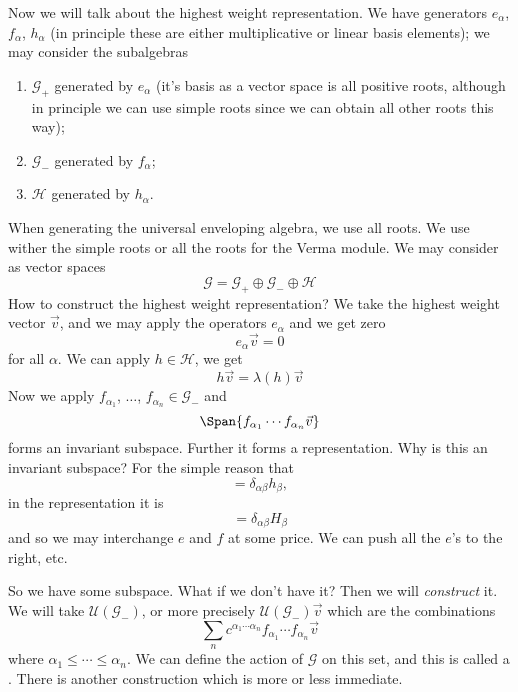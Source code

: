 Now we will talk about the highest weight representation. We have
generators $e_{\alpha}$, $f_{\alpha}$, $h_{\alpha}$ (in principle
these are either multiplicative or linear basis elements); we may
consider the subalgebras
\begin{enumerate}
\item $\mathscr{G}_{+}$ generated by $e_{\alpha}$ (it's basis as
  a vector space is all positive roots, although in principle we
  can use simple roots since we can obtain all other roots this way);
\item $\mathscr{G}_{-}$ generated by $f_{\alpha}$;
\item $\mathscr{H}$ generated by $h_{\alpha}$.
\end{enumerate}
When generating the universal enveloping algebra, we use all
roots. We use wither the simple roots or all the roots for the
Verma module. We may consider as vector spaces
\begin{equation}
\mathscr{G}=\mathscr{G}_{+}\oplus\mathscr{G}_{-}\oplus\mathscr{H}
\end{equation}
How to construct the highest weight representation? We take the
highest weight vector $\vec{v}$, and we may apply the operators
$e_{\alpha}$ and we get zero
\begin{equation}
e_{\alpha}\vec{v}=0
\end{equation}
for all $\alpha$. We can apply $h\in\mathscr{H}$, we get
\begin{equation}
h\vec{v}=\lambda(h)\vec{v}
\end{equation}
Now we apply $f_{\alpha_{1}}$, $\dots$,
$f_{\alpha_{n}}\in\mathscr{G}_{-}$ and
\begin{equation}
\Span\{f_{\alpha_{1}}\cdots f_{\alpha_{n}}\vec{v}\}
\end{equation}
forms an invariant subspace. Further it forms a
representation. Why is this an invariant subspace? For the simple
reason that
\begin{equation}
[e_{\alpha},f_{\beta}]=\delta_{\alpha\beta}h_{\beta},
\end{equation}
in the representation it is
\begin{equation}
[E_{\alpha},F_{\beta}]=\delta_{\alpha\beta}H_{\beta}
\end{equation}
and so we may interchange $e$ and $f$ at some price. We can push
all the $e$'s to the right, etc.

So we have some subspace. What if we don't have it? Then we will
\emph{construct} it. We will take $\mathcal{U}(\mathscr{G}_{-})$,
or more precisely $\mathcal{U}(\mathscr{G}_{-})\vec{v}$
 which are the combinations
\begin{equation}
\sum_{n}c^{\alpha_{1}\cdots\alpha_{n}}f_{\alpha_{1}}\cdots f_{\alpha_{n}}\vec{v}
\end{equation}
where $\alpha_{1}\leq\cdots\leq\alpha_{n}$. We can define the
action of $\mathscr{G}$ on this set, and this is called a
. There is another construction which is
more or less immediate.

